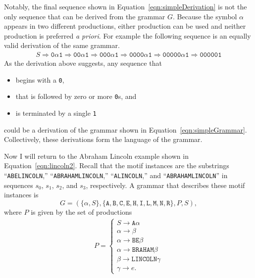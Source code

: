 Notably, the final sequence shown in
Equation~\ref{eqn:simpleDerivation} is not the only sequence that
can be derived from the grammar $G$.  Because the symbol
$\alpha$ appears in two different productions, either production can
be used and neither production is preferred \emph{a priori}.  For
example the following sequence is an equally valid derivation of the
same grammar.
\begin{align}\label{eqn:simpleDerivation2}
    S \Rightarrow \texttt{0}\alpha \texttt{1}  \Rightarrow \texttt{00}\alpha \texttt{1}
    \Rightarrow \texttt{000}\alpha \texttt{1}
    \Rightarrow \texttt{0000}\alpha \texttt{1}
    \Rightarrow \texttt{00000}\alpha \texttt{1}
    \Rightarrow \texttt{00000}\texttt{1}
\end{align}
As the derivation above suggests, any sequence that
\begin{itemize}
  \item begins with a \texttt{0},
  \item that is followed by zero or more \texttt{0}s, and
  \item is terminated by a single \texttt{1}
\end{itemize}
could be a derivation of the grammar shown in
Equation~\vref{eqn:simpleGrammar}. Collectively, these derivations
form the language of the grammar.


Now I will return to the Abraham Lincoln example shown in
Equation~\vref{eqn:lincoln2}.  Recall that the motif instances are
the substrings ``\texttt{ABELINCOLN},'' ``\texttt{ABRAHAMLINCOLN},''
``\texttt{ALINCOLN},'' and ``\texttt{ABRAHAMLINCOLN}'' in sequences
$s_0$, $s_1$, $s_2$, and $s_3$, respectively.  A grammar that
describes these motif instances is
\begin{equation}\label{eqn:abeGrammar}
    G = (\{\alpha, S\},\{\texttt{A}, \texttt{B}, \texttt{C},\texttt{E}, \texttt{H}, \texttt{I},
    \texttt{L}, \texttt{M}, \texttt{N}, \texttt{R}\},P,S),
\end{equation}
where $P$ is given by the set of productions
\begin{align}\label{eqn:abeProduction}
    P =
    \begin{cases}
    S \rightarrow \texttt{A}\alpha \\
    \alpha \rightarrow \beta \\
    \alpha \rightarrow \texttt{BE}\beta \\
    \alpha \rightarrow \texttt{BRAHAM}\beta \\
    \beta \rightarrow \texttt{LINCOLN}\gamma \\
    \gamma \rightarrow e.
    \end{cases}
\end{align}


